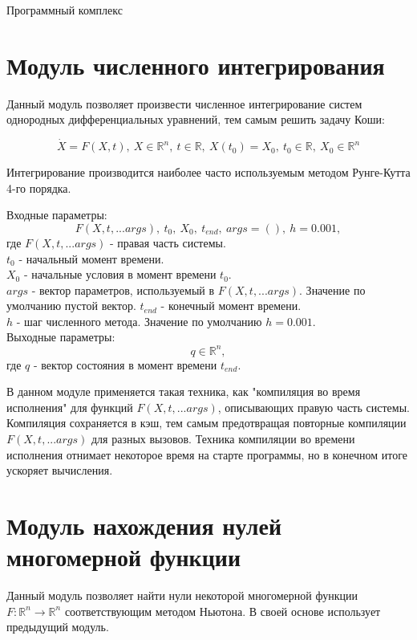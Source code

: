 \begin{chapter}{Программный комплекс}
\section{Модуль численного интегрирования}
Данный модуль позволяет произвести численное интегрирование систем однородных
дифференциальных уравнений, тем самым решить задачу Коши:

$$
\dot{X} = F(X, t), \ X \in \mathbb{R}^n, \ t \in \mathbb{R}, \ X(t_0) = X_0, \ t_0 \in \mathbb{R}, \ X_0 \in \mathbb{R}^n
$$

Интегрирование производится наиболее часто используемым методом Рунге-Кутта 4-го порядка.

Входные параметры: $$F(X, t, ...args), \ t_0, \ X_0,  \ t_{end}, \ args = (), \ h=0.001,$$
где $F(X, t, ...args)$ - правая часть системы. \\
$t_0$ - начальный момент времени. \\
$X_0$ - начальные условия в момент времени $t_0$. \\
$args$ - вектор параметров, используемый в $F(X, t, ...args)$. Значение по умолчанию пустой вектор.
$t_{end}$ - конечный момент времени. \\
$h$ - шаг численного метода. Значение по умолчанию $h = 0.001$. \\
Выходные параметры: $$ q \in \mathbb{R}^n,$$
где $q$ - вектор состояния в момент времени $t_{end}$.

В данном модуле применяется такая техника, как "компиляция во время исполнения"
для функций $F(X, t, ...args)$, описывающих правую часть системы. Компиляция сохраняется в кэш, тем
самым предотвращая повторные компиляции $F(X, t, ...args)$ для разных вызовов.
Техника компиляции во времени исполнения отнимает некоторое время на старте программы, но в конечном итоге ускоряет вычисления.

\section{Модуль нахождения нулей многомерной функции}
Данный модуль позволяет найти нули некоторой многомерной функции $F: \mathbb{R}^n \rightarrow \mathbb{R}^n$ соответствующим методом Ньютона.
В своей основе использует предыдущий модуль.


\end{chapter}
